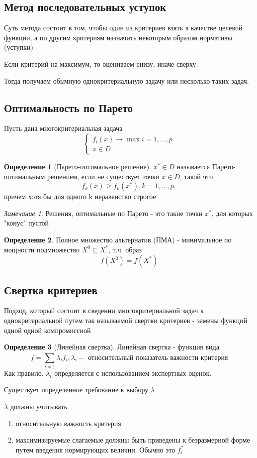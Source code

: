 \documentclass[a4paper]{article}
\theoremstyle{definition}
\newtheorem*{definition}{Определение}
\theoremstyle{remark}
\newtheorem*{remark}{Замечание}
\begin{document}
\subsection{Метод последовательных уступок}
Суть метода состоит в том, чтобы один из критериев взять в качестве целевой функции, а по другим критериям назначить некоторым образом нормативы (уступки)

Если критерий на максимум, то оцениваем снизу, иначе сверху.

Тогда получаем обычную однокритериальную задачу или несколько таких задач.

\subsection{Оптимальность по Парето}
Пусть дана многокритериальная задача
\[\begin{cases}
    f_i(x)\to \max i = 1, \dots, p\\
    x\in D
\end{cases}\]
\begin{definition}[Парето-оптимальное решение]
    $x^*\in D$ называется Парето-оптимальным решением, если 
    не существует точки $x\in D$, такой что
    \[f_k(x) \ge f_k(x^*), k = 1, \dots, p,\]
    причем хотя бы для одного k неравенство строгое
\end{definition}
\begin{remark}
    Решения, оптимальные по Парето - это такие точки $x^*$, для которых "конус" пустой    
\end{remark}
\begin{definition}
    Полное множество альтернатив (ПМА) - минимальное по мощности подмножество $X^0 \subseteq X^*$, т.ч. образ
    \[f(X^0) = f(X^*)\]
\end{definition}
\subsection{Свертка критериев}
Подход, который состоит в сведении многокритериальной задач к однокритериальной путем так называемой свертки критериев - замены функций одной одной компромиссной
\begin{definition}[Линейная свертка]
    Линейная свертка - функция вида
    \[f = \sum_{i=1}^{}\lambda_i f_i, \lambda_i -\text{ относительный показатель важности критерия}\]
    Как правило, $\lambda_i$ определяется с использованием экспертных оценок.
\end{definition}
Существует определенное требование к выбору $\lambda$

$\lambda$ должны учитывать 
\begin{enumerate}
    \item относительную важность критерия
    \item максимизируемые слагаемые должны быть приведены к безразмерной форме путем введения нормирующих величин. Обычно это $f_i^*$
\end{enumerate}
\end{document}
